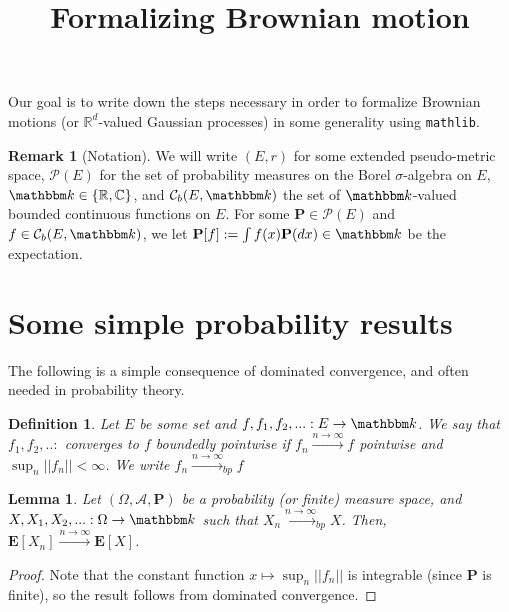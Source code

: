 \documentclass{article}
\newtheorem{lemma}[proposition]{Lemma}
\newtheorem{definition}[proposition]{Definition}
\theoremstyle{definition}
\newtheorem{remark}[proposition]{Remark}
\theoremstyle{step} \newtheorem{step}{Step}
\begin{document}
\title{\LARGE Formalizing Brownian motion}

\maketitle Our goal is to write down the steps necessary in order to
formalize Brownian motions (or $\mathbb R^d$-valued Gaussian
processes) in some generality using {\tt mathlib}.

\begin{remark}[Notation]
  We will write $(E,r)$ for some extended pseudo-metric space, $\mathcal
    P(E)$ for the set of probability measures on the Borel
  $\sigma$-algebra on $E$, $\mathbbm k \in \{\mathbb R, \mathbb C\}$,
  and $\mathcal C_{b}(E, \mathbbm k)$ the set of $\mathbbm k$-valued
  bounded continuous functions on $E$. For some $\mathbf P \in \mathcal
    P(E)$ and $f \in \mathcal C_{b}(E, \mathbbm k)$, we let $\mathbf P[f]
    := \int f(x) \mathbf P(dx) \in \mathbbm k$ be the expectation.
\end{remark}

\setcounter{section}{-1}
\section{Some simple probability results}
The following is a simple consequence of dominated convergence, and
often needed in probability theory.

\begin{definition}
  Let $E$ be some set and $f, f_1, f_2,...: E \to \mathbbm k$. We say
  that $f_1,f_2,..:$ converges to $f$ boundedly pointwise if $f_n
    \xrightarrow{n\to\infty} f$ pointwise and $\sup_n ||f_n|| <
    \infty$. We write $f_n \xrightarrow{n\to\infty}_{bp} f$
\end{definition}

\begin{lemma}\label{lemma:bp}
  Let $(\Omega, \mathcal A, \mathbf P)$ be a probability (or finite)
  measure space, and $X, X_1, X_2,... : \Omega \to \mathbbm k$ such
  that $X_n \xrightarrow{n\to\infty}_{bp} X$. Then, $\mathbf E[X_n]
    \xrightarrow{n\to\infty} \mathbf E[X]$.
\end{lemma}

\begin{proof}
  Note that the constant function $x \mapsto \sup_n ||f_n||$ is
  integrable (since $\mathbf P$ is finite), so the result follows from
  dominated convergence.
\end{proof}
\end{document}
